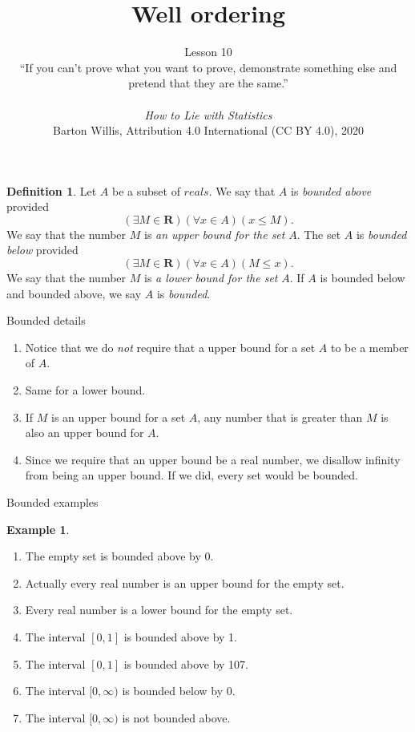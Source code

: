 \documentclass[fleqn]{beamer}
\title{\textbf{Well ordering}}
\subtitle{Lesson 10   \\ \vspace{0.5in}
  ``If you can't prove what you want to prove, demonstrate something else and pretend that they are the same.''  \\   \vspace{0.15in}{Darrell Huff} \\ \vspace{0.15in} \emph{How to Lie with Statistics} \\
 \vspace{1.0in}
  \tiny Barton Willis, Attribution 4.0 International (CC BY 4.0), 2020 \normalsize
   }
\date{}
\newcommand{\reals}{\mathbf{R}}
\theoremstyle{definition}
\newtheorem{mydef}{Definition}
\newtheorem{myex}{Example}
\newenvironment{numberlist}
   {\begin{enumerate}[(1)]
       \addtolength{\itemsep}{-0.5\itemsep}}
     {\end{enumerate}}
\begin{document}
\frame{\titlepage}


\begin{frame}

\begin{mydef} Let \(A\) be a subset of \(reals\). We say that \(A\) is \emph{bounded above} provided
\[
   \left (\exists M \in \reals \right) \left( \forall x \in A \right)(x \leq M).
\]
We say that the number \(M\) is \emph{an upper bound for  the set } \(A\).
The set  \(A\) is \emph{bounded below} provided
\[
   \left (\exists M \in \reals \right) \left( \forall x \in A \right)(M \leq x).
\]
We say that the number \(M\) is \emph{a lower bound for  the set } \(A\). If \(A\) is bounded below and bounded above, we say \(A\) is \emph{bounded}.
\end{mydef}

\end{frame}
\begin{frame}{Bounded details}

\begin{numberlist}

\item Notice that we do \emph{not} require that a upper bound for a set \(A\) to be a member of \(A\).

\item Same for a lower bound.

\item If \(M\) is an upper bound for a set \(A\), any number that is greater than \(M\) is also an upper bound for \(A\).

\item Since we require that an upper bound be a real number, we disallow infinity from being an upper bound.  If we did, every set would be bounded.

\end{numberlist}

\end{frame}

\begin{frame}{Bounded examples}

\begin{myex}
  \begin{numberlist}
    \item The empty set is bounded above by 0.
      \item Actually every real number is an upper bound for the empty set.
      \item Every real number is a lower bound for the empty set.
   \item The interval \([0,1] \) is bounded above by 1.
   \item The interval \([0,1] \) is bounded above by 107.
   \item The interval \([0,\infty) \) is bounded below by 0.
   \item The interval \([0,\infty) \) is not bounded above.
\end{numberlist}
\end{myex}

\end{frame}
\end{document}
